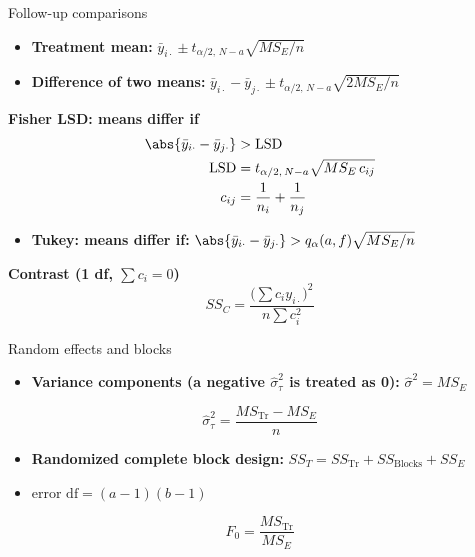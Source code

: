 \begin{formulabox}{Follow-up comparisons}
\begin{itemize}
  \item \textbf{Treatment mean:} $\bar{y}_{i\cdot}\pm t_{\alpha/2,\,N-a}\sqrt{MS_E/n}$
  \item \textbf{Difference of two means:} $\bar{y}_{i\cdot}-\bar{y}_{j\cdot}\pm t_{\alpha/2,\,N-a}\sqrt{2MS_E/n}$
\end{itemize}
\textbf{Fisher LSD: means differ if}
\[ \begin{aligned}\abs{\bar{y}_{i\cdot}-\bar{y}_{j\cdot}}&>\mathrm{LSD}\\ \mathrm{LSD}&=t_{\alpha/2,\,N-a}\sqrt{MS_E\,c_{ij}}\\ c_{ij}&=\frac1{n_i}+\frac1{n_j}\end{aligned} \]
\begin{itemize}
  \item \textbf{Tukey: means differ if:} $\abs{\bar{y}_{i\cdot}-\bar{y}_{j\cdot}}>q_\alpha(a,f)\sqrt{MS_E/n}$
\end{itemize}
\textbf{Contrast (1 df, $\sum c_i=0$)}
\[ SS_C=\frac{\big(\sum c_iy_{i\cdot}\big)^2}{n\sum c_i^2} \]
\end{formulabox}

\begin{formulabox}{Random effects and blocks}
\begin{itemize}
  \item \textbf{Variance components (a negative $\hat\sigma_\tau^2$ is treated as 0):} $\hat\sigma^2=MS_E$
\end{itemize}
\[ \hat\sigma_\tau^2=\frac{MS_{\text{Tr}}-MS_E}{n} \]
\begin{itemize}
  \item \textbf{Randomized complete block design:} $SS_T=SS_{\text{Tr}}+SS_{\text{Blocks}}+SS_E$
  \item $\text{error df}=(a-1)(b-1)$
\end{itemize}
\[ F_0=\frac{MS_{\text{Tr}}}{MS_E} \]
\end{formulabox}

